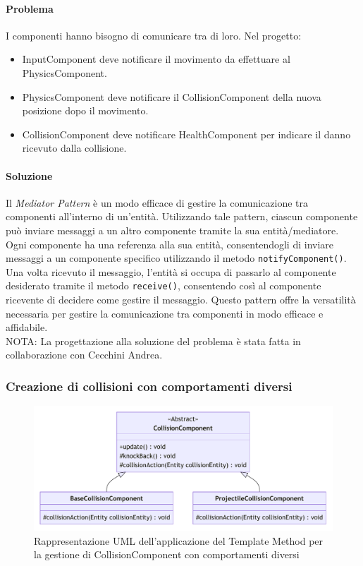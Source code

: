 \documentclass[a4paper,12pt]{report}
\begin{document}
\paragraph{Problema} I componenti hanno bisogno di comunicare tra di loro. Nel progetto:
\begin{itemize}
	\item InputComponent deve notificare il movimento da effettuare al PhysicsComponent.
	\item PhysicsComponent deve notificare il CollisionComponent della nuova posizione dopo il movimento.
	\item CollisionComponent deve notificare HealthComponent per indicare il danno ricevuto dalla collisione.
\end{itemize}
\paragraph{Soluzione} Il \textit{Mediator Pattern} è un modo efficace di gestire la comunicazione tra componenti
all'interno di un'entità. Utilizzando tale pattern, ciascun componente può inviare messaggi a un altro componente 
tramite la sua entità/mediatore. Ogni componente ha una referenza alla sua entità, consentendogli di inviare messaggi
a un componente specifico utilizzando il metodo \texttt{notifyComponent()}. Una volta ricevuto il messaggio, l'entità 
si occupa di passarlo al componente desiderato tramite il metodo \texttt{receive()}, consentendo così al componente ricevente 
di decidere come gestire il messaggio. Questo pattern offre la versatilità necessaria per gestire la comunicazione tra componenti 
in modo efficace e affidabile. \\
NOTA: La progettazione alla soluzione del problema è stata fatta in collaborazione con Cecchini Andrea.

\subsubsection{Creazione di collisioni con comportamenti diversi}

\begin{figure}[H]
\centering{}
\includegraphics[width=\textwidth]{img/CollisionComponentUML}
\caption{Rappresentazione UML dell'applicazione del Template Method per la gestione di CollisionComponent con comportamenti diversi}
\end{figure}
	
\end{document}
